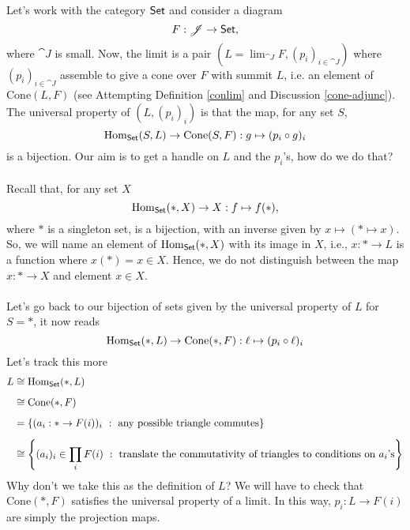 \begin{example}\label{liminset}
Let's work with the category $\mathsf{Set}$ and consider a diagram
\[F:\mathscr{J} \to \mathsf{Set},\]
where $\cat{J}$ is small. Now, the limit is a pair $(L = \lim_{\cat{J}}F,(p_i)_{i\in \cat{J}})$ where $(p_i)_{i\in \cat{J}}$ assemble to give a cone over $F$ with summit $L$, i.e. an element of $\mathrm{Cone}(L,F)$ (see Attempting Definition \ref{conlim} and Discussion \ref{cone-adjunc}). The universal property of $(L,(p_i)_i)$ is that the map, for any set $S$,
\[\mathrm{Hom}_{\mathsf{Set}}(S,L) \to \mathrm{Cone}(S,F): g \mapsto (p_i \circ g)_i\]
is a bijection. Our aim is to get a handle on $L$ and the $p_i$'s, how do we do that?\\
\\
Recall that, for any set $X$
\[\mathrm{Hom}_{\mathsf{Set}}(*,X) \to X: f \mapsto f(*),\]
where $*$ is a singleton set, is a bijection, with an inverse given by $x \mapsto (* \mapsto x)$. So, we will name an element of $\mathrm{Hom}_{\mathsf{Set}}(*,X)$ with its image in $X$, i.e., $x: * \to L$ is a function where $x(*) = x \in X$. Hence, we do not distinguish between the map $x: * \to X$ and element $x \in X$.\\
\\
Let's go back to our bijection of sets given by the universal property of $L$ for $S = *$, it now reads
\[\mathrm{Hom}_{\mathsf{Set}}(*,L) \to \mathrm{Cone}(*,F): \ell \mapsto (p_i \circ \ell)_i\]
Let's track this more
\begin{align*}
L &\cong \mathrm{Hom}_{\mathsf{Set}}(*,L)\\[0.5em]
&\cong \mathrm{Cone}(*,F)\\[0.5em]
&= \left\{(a_i: * \to F(i))_i\ :\ \text{any possible triangle commutes}\right\}\\[0.5em]
&\cong \left\{(a_i)_i \in \prod_i F(i)\ :\ \text{translate the commutativity of triangles to conditions on $a_i$'s}\right\}
\end{align*}
Why don't we take this as the definition of $L$? We will have to check that $\mathrm{Cone}(*,F)$ satisfies the universal property of a limit. In this way, $p_i:L \to F(i)$ are simply the projection maps.
\end{example}

\vspace*{0.1in}

